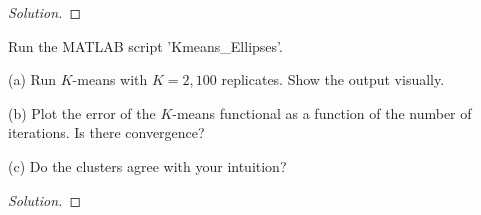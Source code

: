 \documentclass[10pt]{article}
\newenvironment{problem}[2][]{\begin{trivlist}
\item[\hskip \labelsep {\bfseries #1}\hskip \labelsep {\bfseries #2.}]}{\end{trivlist}}
\begin{document}
\begin{proof}[Solution]


\end{proof}

\begin{problem}{Question 6}
 
Run the MATLAB script 'Kmeans\_Ellipses'.

(a) Run $K$-means with $K=2, 100$ replicates. Show the output visually.

(b) Plot the error of the $K$-means functional as a function of the number of iterations. Is there convergence?

(c) Do the clusters agree with your intuition?

\end{problem}

\begin{proof}[Solution]


\end{proof}
\end{document}
